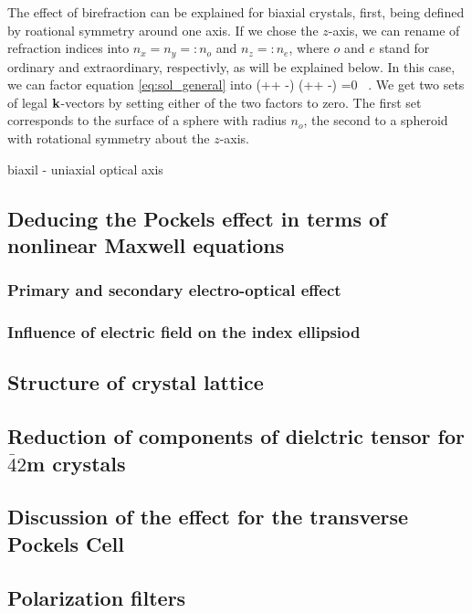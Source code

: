 The effect of birefraction can be explained for biaxial crystals, first, being defined 
by roational symmetry around one axis. If we chose the $z$-axis, we can rename of 
refraction indices into $n_x = n_y =: n_o$ and $n_z =: n_e$, where $o$ and $e$ stand for 
ordinary and extraordinary, respectivly, as will be explained below. In this case, 
we can factor equation \eqref{eq:sol_general} into 
\beq
\left(++ -\right)
\left(++ -\right)
=0 \, . 
\label{eq:sol_biax}
\eeq
We get two sets of legal $\mathbf{k}$-vectors by setting either of the two factors to zero. 
The first set corresponds to the surface of a sphere with radius $n_o$, 
the second to a spheroid with rotational symmetry about the $z$-axis. 



biaxil - uniaxial 
optical axis 


\subsection{Deducing the Pockels effect in terms of nonlinear Maxwell equations}
\subsubsection{Primary and secondary electro-optical effect}
\subsubsection{Influence of electric field on the index ellipsiod}

\subsection{Structure of crystal lattice}

\subsection{Reduction of components of dielctric tensor for $\bar{4}2$m crystals}

\subsection{Discussion of the effect for the transverse Pockels Cell}

\subsection{Polarization filters}

